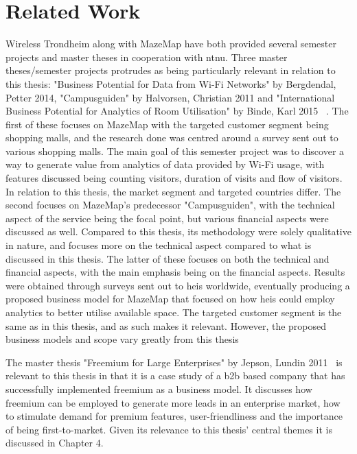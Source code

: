 \section{Related Work}
Wireless Trondheim along with MazeMap have both provided several semester projects and master theses in cooperation with \gls{ntnu}. Three master theses/semester projects protrudes as being particularly relevant in relation to this thesis: "Business Potential for Data from Wi-Fi Networks" by Bergdendal, Petter 2014, "Campusguiden" by Halvorsen, Christian 2011 and "International Business Potential for Analytics of Room Utilisation" by Binde, Karl 2015~\cite{petterbergendal2014} \cite{christianhalvorsen2011} \cite{karlbernhoffbinde2015}. The first of these focuses on MazeMap with the targeted customer segment being shopping malls, and the research done was centred around a survey sent out to various shopping malls. The main goal of this semester project was to discover a way to generate value from analytics of data provided by Wi-Fi usage, with features discussed being counting visitors, duration of visits and flow of visitors. In relation to this thesis, the market segment and targeted countries differ. The second focuses on MazeMap's predecessor "Campusguiden", with the technical aspect of the service being the focal point, but various financial aspects were discussed as well. Compared to this thesis, its methodology were solely qualitative in nature, and focuses more on the technical aspect compared to what is discussed in this thesis. The latter of these focuses on both the technical and financial aspects, with the main emphasis being on the financial aspects. Results were obtained through surveys sent out to \glspl{hei} worldwide, eventually producing a proposed business model for MazeMap that focused on how \glspl{hei} could employ analytics to better utilise available space. The targeted customer segment is the same as in this thesis, and as such makes it relevant. However, the proposed business models and scope vary greatly from this thesis


The master thesis "Freemium for Large Enterprises" by Jepson, Lundin 2011~\cite{jepson2009freemium} is relevant to this thesis in that it is a case study of a \gls{b2b} based company that has successfully implemented freemium as a business model. It discusses how freemium can be employed to generate more leads in an enterprise market, how to stimulate demand for premium features, user-friendliness and the importance of being first-to-market. Given its relevance to this thesis' central themes it is discussed in Chapter 4.